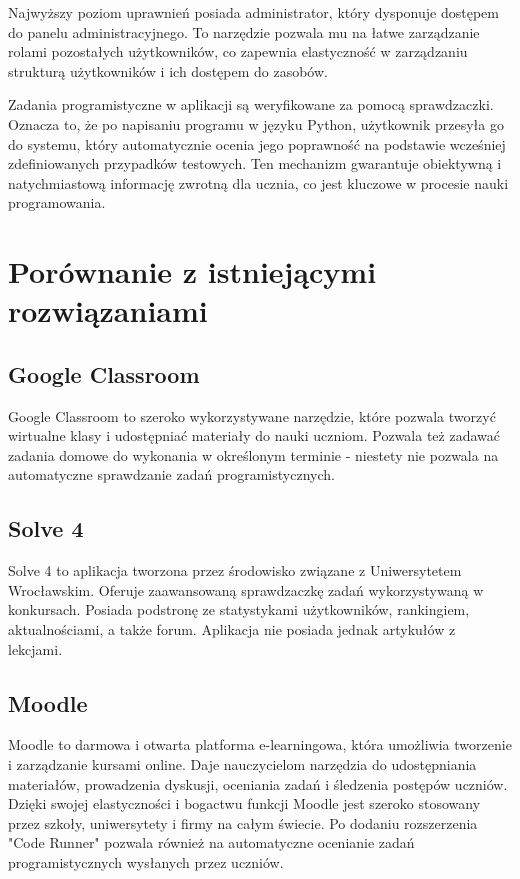 \documentclass[shortabstract,inz]{iithesis}
\begin{document}
Najwyższy poziom uprawnień posiada administrator, który dysponuje dostępem do panelu administracyjnego. To narzędzie pozwala mu na łatwe zarządzanie rolami pozostałych użytkowników, co zapewnia elastyczność w zarządzaniu strukturą użytkowników i ich dostępem do zasobów.

Zadania programistyczne w aplikacji są weryfikowane za pomocą sprawdzaczki. Oznacza to, że po napisaniu programu w języku Python, użytkownik przesyła go do systemu, który automatycznie ocenia jego poprawność na podstawie wcześniej zdefiniowanych przypadków testowych. Ten mechanizm gwarantuje obiektywną i natychmiastową informację zwrotną dla ucznia, co jest kluczowe w procesie nauki programowania.

\section{Porównanie z istniejącymi rozwiązaniami}
\subsection{Google Classroom}
Google Classroom \cite{bib:google-classroom} to szeroko wykorzystywane narzędzie, które pozwala tworzyć wirtualne klasy i udostępniać materiały do nauki uczniom. Pozwala też zadawać zadania domowe do wykonania w określonym terminie - niestety nie pozwala na automatyczne sprawdzanie zadań programistycznych.

\subsection{Solve 4}
Solve 4 \cite{bib:solve-4} to aplikacja tworzona przez środowisko związane z Uniwersytetem Wrocławskim. Oferuje zaawansowaną sprawdzaczkę zadań wykorzystywaną w konkursach. Posiada podstronę ze statystykami użytkowników, rankingiem, aktualnościami, a także forum. Aplikacja nie posiada jednak artykułów z lekcjami.

\subsection{Moodle}
Moodle \cite{bib:moodle} to darmowa i otwarta platforma e-learningowa, która umożliwia tworzenie i zarządzanie kursami online. Daje nauczycielom narzędzia do udostępniania materiałów, prowadzenia dyskusji, oceniania zadań i śledzenia postępów uczniów. Dzięki swojej elastyczności i bogactwu funkcji Moodle jest szeroko stosowany przez szkoły, uniwersytety i firmy na całym świecie. Po dodaniu rozszerzenia "Code Runner" \cite{bib:moodle-code-runner} pozwala również na automatyczne ocenianie zadań programistycznych wysłanych przez uczniów. 
\end{document}

